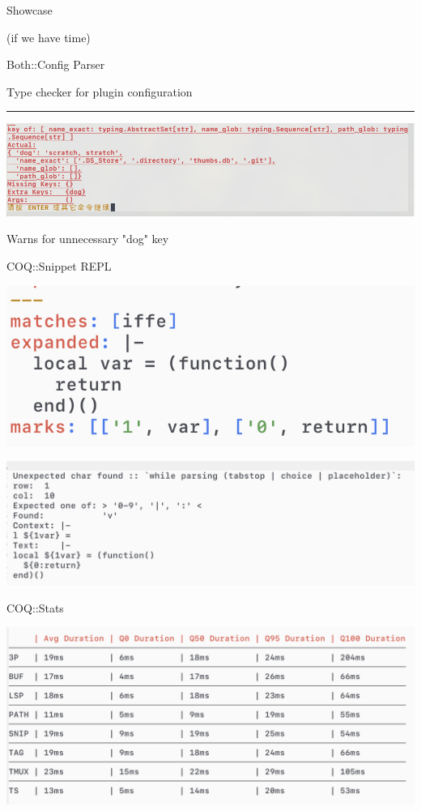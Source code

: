 \documentclass{beamer}
\begin{document}
\begin{frame}[standout]

	Showcase

	(if we have time)

\end{frame}


\begin{frame}{Both::Config Parser}

	Type checker for plugin configuration

	\rule{\textwidth}{0.1em}

	\includegraphics[width=\textwidth]{conf_parser}

	Warns for unnecessary "dog" key

\end{frame}


\begin{frame}{COQ::Snippet REPL}

	\includegraphics[width=\textwidth]{repl_succ}

	\includegraphics[width=\textwidth]{repl_fail}

\end{frame}


\begin{frame}{COQ::Stats}

	\includegraphics[width=\textwidth]{stats}

\end{frame}
\end{document}
